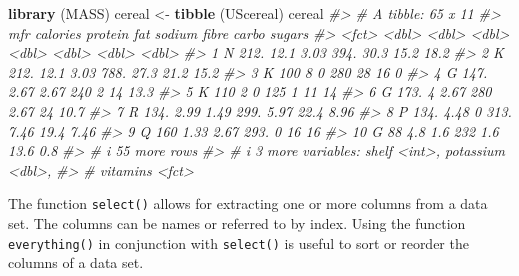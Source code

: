 \documentclass[
]{book}
\newenvironment{Shaded}{\begin{snugshade}}{\end{snugshade}}
\newcommand{\CommentTok}[1]{\textcolor[rgb]{0.56,0.35,0.01}{\textit{#1}}}
\newcommand{\FunctionTok}[1]{\textcolor[rgb]{0.13,0.29,0.53}{\textbf{#1}}}
\newcommand{\NormalTok}[1]{#1}
\newcommand{\OtherTok}[1]{\textcolor[rgb]{0.56,0.35,0.01}{#1}}
\begin{document}
\begin{Shaded}
\begin{Highlighting}[]
\FunctionTok{library}\NormalTok{ (MASS)}
\NormalTok{cereal }\OtherTok{\textless{}{-}} \FunctionTok{tibble}\NormalTok{ (UScereal)}
\NormalTok{cereal}
\CommentTok{\#\textgreater{} \# A tibble: 65 x 11}
\CommentTok{\#\textgreater{}    mfr   calories protein   fat sodium fibre carbo sugars}
\CommentTok{\#\textgreater{}    \textless{}fct\textgreater{}    \textless{}dbl\textgreater{}   \textless{}dbl\textgreater{} \textless{}dbl\textgreater{}  \textless{}dbl\textgreater{} \textless{}dbl\textgreater{} \textless{}dbl\textgreater{}  \textless{}dbl\textgreater{}}
\CommentTok{\#\textgreater{}  1 N         212.   12.1   3.03   394. 30.3   15.2  18.2 }
\CommentTok{\#\textgreater{}  2 K         212.   12.1   3.03   788. 27.3   21.2  15.2 }
\CommentTok{\#\textgreater{}  3 K         100     8     0      280  28     16     0   }
\CommentTok{\#\textgreater{}  4 G         147.    2.67  2.67   240   2     14    13.3 }
\CommentTok{\#\textgreater{}  5 K         110     2     0      125   1     11    14   }
\CommentTok{\#\textgreater{}  6 G         173.    4     2.67   280   2.67  24    10.7 }
\CommentTok{\#\textgreater{}  7 R         134.    2.99  1.49   299.  5.97  22.4   8.96}
\CommentTok{\#\textgreater{}  8 P         134.    4.48  0      313.  7.46  19.4   7.46}
\CommentTok{\#\textgreater{}  9 Q         160     1.33  2.67   293.  0     16    16   }
\CommentTok{\#\textgreater{} 10 G          88     4.8   1.6    232   1.6   13.6   0.8 }
\CommentTok{\#\textgreater{} \# i 55 more rows}
\CommentTok{\#\textgreater{} \# i 3 more variables: shelf \textless{}int\textgreater{}, potassium \textless{}dbl\textgreater{},}
\CommentTok{\#\textgreater{} \#   vitamins \textless{}fct\textgreater{}}
\end{Highlighting}
\end{Shaded}

The function \texttt{select()} allows for extracting one or more columns from a data set. The columns can be names or referred to by index. Using the function \texttt{everything()} in conjunction with \texttt{select()} is useful to sort or reorder the columns of a data set.
\end{document}
